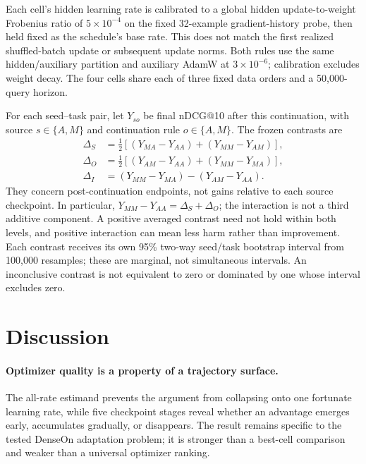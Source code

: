 \documentclass[11pt]{article}
\begin{document}
Each cell's hidden learning rate is calibrated to a global hidden update-to-weight Frobenius ratio
of $5\!\times\!10^{-4}$ on the fixed 32-example gradient-history probe, then held fixed as the
schedule's base rate. This does not match the first realized shuffled-batch update or subsequent
update norms. Both rules use the same hidden/auxiliary partition and auxiliary AdamW at
$3\!\times\!10^{-6}$; calibration excludes weight decay. The four cells share each of three fixed
data orders and a 50,000-query horizon.

For each seed--task pair, let $Y_{so}$ be final nDCG@10 after this continuation, with source
$s\in\{A,M\}$ and continuation rule $o\in\{A,M\}$. The frozen contrasts are
\begin{align}
\Delta_S &= \tfrac12[(Y_{MA}-Y_{AA})+(Y_{MM}-Y_{AM})],\\
\Delta_O &= \tfrac12[(Y_{AM}-Y_{AA})+(Y_{MM}-Y_{MA})],\\
\Delta_I &= (Y_{MM}-Y_{MA})-(Y_{AM}-Y_{AA}).
\end{align}
They concern post-continuation endpoints, not gains relative to each source checkpoint. In
particular, $Y_{MM}-Y_{AA}=\Delta_S+\Delta_O$; the interaction is not a third additive component.
A positive averaged contrast need not hold within both levels, and positive interaction can mean
less harm rather than improvement. Each contrast receives its own 95\% two-way seed/task bootstrap
interval from 100,000 resamples; these are marginal, not simultaneous intervals. An inconclusive
contrast is not equivalent to zero or dominated by one whose interval excludes zero.

\StateOperatorMechanismFinding

\section{Discussion}

\paragraph{Optimizer quality is a property of a trajectory surface.}
The all-rate estimand prevents the argument from collapsing onto one fortunate learning rate, while
five checkpoint stages reveal whether an advantage emerges early, accumulates gradually, or
disappears. The result remains specific to the tested DenseOn adaptation problem; it is stronger
than a best-cell comparison and weaker than a universal optimizer ranking.
\end{document}
